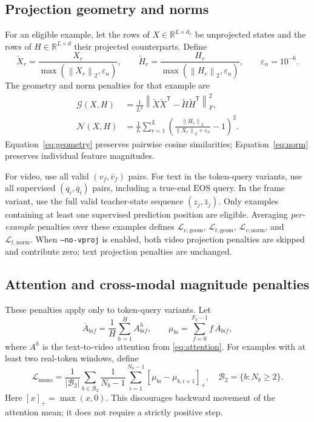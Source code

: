 \documentclass[11pt,a4paper]{article}
\newcommand{\R}{\mathbb{R}}
\newcommand{\EOS}{\mathrm{EOS}}
\newcommand{\eps}{\varepsilon}
\newcommand{\norm}[1]{\left\lVert #1\right\rVert}
\newcommand{\pos}[1]{\left[#1\right]_{+}}
\numberwithin{equation}{section}
\begin{document}
\subsection{Projection geometry and norms}

For an eligible example, let the rows of $X\in\R^{L\times d_x}$ be
unprojected states and the rows of $H\in\R^{L\times d}$ their projected
counterparts. Define
\begin{equation}
\widetilde X_r=\frac{X_r}{\max(\norm{X_r}_2,\eps_n)},\qquad
\widetilde H_r=\frac{H_r}{\max(\norm{H_r}_2,\eps_n)},
\qquad \eps_n=10^{-6}.
\end{equation}
The geometry and norm penalties for that example are
\begin{align}
\mathcal G(X,H)
 &=\frac{1}{L^2}\norm{\widetilde X\widetilde X^{\mathsf T}
                     -\widetilde H\widetilde H^{\mathsf T}}_F^2,
\label{eq:geometry}\\
\mathcal N(X,H)
 &=\frac1L\sum_{r=1}^{L}
 \left(\frac{\norm{H_r}_2}{\norm{X_r}_2+\eps_n}-1\right)^2.
\label{eq:norm}
\end{align}
Equation~\eqref{eq:geometry} preserves pairwise cosine similarities;
Equation~\eqref{eq:norm} preserves individual feature magnitudes.

For video, use all valid $(v_f,\bar v_f)$ pairs. For text in the
token-query variants, use all supervised $(q_i,\bar q_i)$ pairs,
including a true-end $\EOS$ query. In the frame variant, use the full
valid teacher-state sequence $(z_j,\bar z_j)$. Only examples containing
at least one supervised prediction position are eligible. Averaging
\emph{per-example} penalties over these examples defines
$\mathcal L_{v,\mathrm{geom}}$, $\mathcal L_{t,\mathrm{geom}}$,
$\mathcal L_{v,\mathrm{norm}}$, and $\mathcal L_{t,\mathrm{norm}}$.
When \texttt{--no-vproj} is enabled, both video projection penalties
are skipped and contribute zero; text projection penalties are unchanged.

\subsection{Attention and cross-modal magnitude penalties}

These penalties apply only to token-query variants. Let
\begin{equation}
\overline A_{bif}=\frac1H\sum_{h=1}^{H}A^h_{bif},\qquad
\mu_{bi}=\sum_{f=0}^{F_b-1}f\,\overline A_{bif},
\end{equation}
where $A^h$ is the text-to-video attention from
\eqref{eq:attention}. For examples with at least two real-token
windows, define
\begin{equation}
\mathcal L_{\mathrm{mono}}
=\frac{1}{|\mathcal B_2|}\sum_{b\in\mathcal B_2}
 \frac{1}{N_b-1}\sum_{i=1}^{N_b-1}
 \pos{\mu_{bi}-\mu_{b,i+1}},
\quad \mathcal B_2=\{b:N_b\geq2\}.
\label{eq:monotonic}
\end{equation}
Here $[x]_+=\max(x,0)$. This discourages backward movement of the
attention mean; it does not require a strictly positive step.
\end{document}
